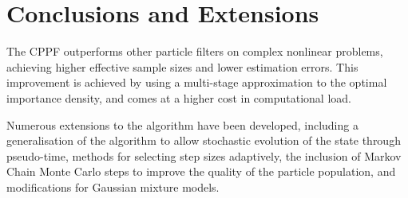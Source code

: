 \documentclass[conference]{IEEEtran}
\begin{document}
\section{Conclusions and Extensions}

The CPPF outperforms other particle filters on complex nonlinear problems, achieving higher effective sample sizes and lower estimation errors. This improvement is achieved by using a multi-stage approximation to the optimal importance density, and comes at a higher cost in computational load.

Numerous extensions to the algorithm have been developed, including a generalisation of the algorithm to allow stochastic evolution of the state through pseudo-time, methods for selecting step sizes adaptively, the inclusion of Markov Chain Monte Carlo steps to improve the quality of the particle population, and modifications for Gaussian mixture models.




%
%



%
%
\end{document}
